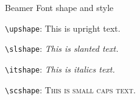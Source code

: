 \documentclass{beamer}
\begin{document}
\begin{frame}[fragile]{Beamer Font shape and style}

\verb|\upshape|: \upshape This is upright text.

\verb|\slshape|: \slshape This is slanted text.

\verb|\itshape|: \itshape This is italics text.

\verb|\scshape|: \scshape This is  small caps text.

\end{frame}
\end{document}
